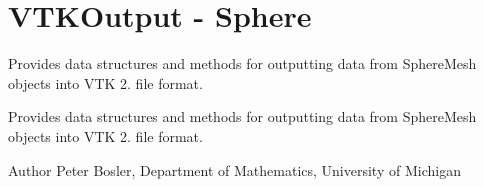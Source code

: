 \hypertarget{group__VTKOutput}{\section{V\+T\+K\+Output -\/ Sphere}
\label{group__VTKOutput}
}


Provides data structures and methods for outputting data from Sphere\+Mesh objects into V\+T\+K 2. file format.  


Provides data structures and methods for outputting data from Sphere\+Mesh objects into V\+T\+K 2. file format. 

\begin{DoxyAuthor}{Author}
Peter Bosler, Department of Mathematics, University of Michigan 
\end{DoxyAuthor}
